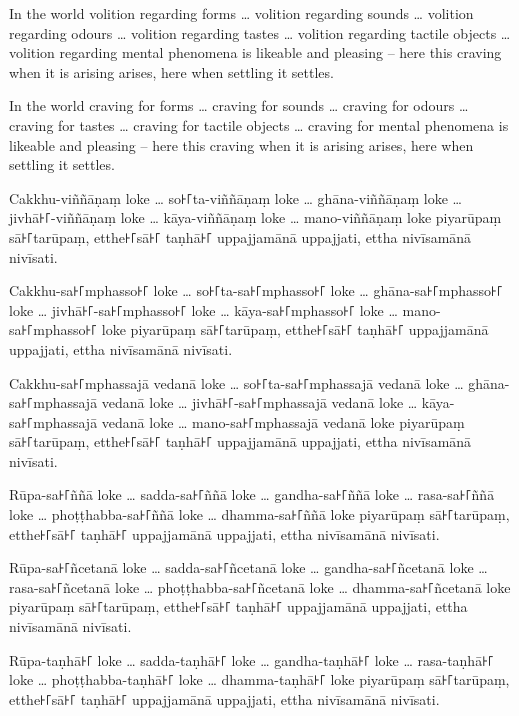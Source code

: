 In the world volition regarding forms \ldots{} volition regarding sounds
\ldots{} volition regarding odours \ldots{} volition regarding tastes \ldots{}
volition regarding tactile objects \ldots{} volition regarding mental phenomena
is likeable and pleasing -- here this craving when it is arising arises, here
when settling it settles.

In the world craving for forms \ldots{} craving for sounds \ldots{} craving for
odours \ldots{} craving for tastes \ldots{} craving for tactile objects \ldots{}
craving for mental phenomena is likeable and pleasing -- here this craving when
it is arising arises, here when settling it settles.

\paliPage

Cakkhu-viññāṇaṃ loke \ldots{} so꜔꜒ta-viññāṇaṃ loke \ldots{} ghāna-viññāṇaṃ loke
\ldots{} jivhā꜔꜒-viññāṇaṃ loke \ldots{} kāya-viññāṇaṃ loke \ldots{} mano-viññāṇaṃ
loke piyarūpaṃ sā꜔꜒tarūpaṃ, etthe꜔꜒sā꜔꜒ taṇhā꜔꜒ uppajjamānā uppajjati, ettha nivīsamānā
nivīsati.

Cakkhu-sa꜔꜒mphasso꜔꜒ loke \ldots{} so꜔꜒ta-sa꜔꜒mphasso꜔꜒ loke \ldots{} ghāna-sa꜔꜒mphasso꜔꜒ loke
\ldots{} jivhā꜔꜒-sa꜔꜒mphasso꜔꜒ loke \ldots{} kāya-sa꜔꜒mphasso꜔꜒ loke \ldots{} mano-sa꜔꜒mphasso꜔꜒
loke piyarūpaṃ sā꜔꜒tarūpaṃ, etthe꜔꜒sā꜔꜒ taṇhā꜔꜒ uppajjamānā uppajjati, ettha nivīsamānā
nivīsati.

Cakkhu-sa꜔꜒mphassajā vedanā loke \ldots{} so꜔꜒ta-sa꜔꜒mphassajā vedanā loke \ldots{}
ghāna-sa꜔꜒mphassajā vedanā loke \ldots{} jivhā꜔꜒-sa꜔꜒mphassajā vedanā loke \ldots{}
kāya-sa꜔꜒mphassajā vedanā loke \ldots{} mano-sa꜔꜒mphassajā vedanā loke piyarūpaṃ
sā꜔꜒tarūpaṃ, etthe꜔꜒sā꜔꜒ taṇhā꜔꜒ uppajjamānā uppajjati, ettha nivīsamānā nivīsati.

Rūpa-sa꜔꜒ññā loke \ldots{} sadda-sa꜔꜒ññā loke \ldots{} gandha-sa꜔꜒ññā loke \ldots{}
rasa-sa꜔꜒ññā loke \ldots{} phoṭṭhabba-sa꜔꜒ññā loke \ldots{} dhamma-sa꜔꜒ññā loke piyarūpaṃ
sā꜔꜒tarūpaṃ, etthe꜔꜒sā꜔꜒ taṇhā꜔꜒ uppajjamānā uppajjati, ettha nivīsamānā nivīsati.

Rūpa-sa꜔꜒ñcetanā loke \ldots{} sadda-sa꜔꜒ñcetanā loke \ldots{} gandha-sa꜔꜒ñcetanā loke
\ldots{} rasa-sa꜔꜒ñcetanā loke \ldots{} phoṭṭhabba-sa꜔꜒ñcetanā loke \ldots{}
dhamma-sa꜔꜒ñcetanā loke piyarūpaṃ sā꜔꜒tarūpaṃ, etthe꜔꜒sā꜔꜒ taṇhā꜔꜒ uppajjamānā uppajjati,
ettha nivīsamānā nivīsati.

Rūpa-taṇhā꜔꜒ loke \ldots{} sadda-taṇhā꜔꜒ loke \ldots{} gandha-taṇhā꜔꜒ loke \ldots{}
rasa-taṇhā꜔꜒ loke \ldots{} phoṭṭhabba-taṇhā꜔꜒ loke \ldots{} dhamma-taṇhā꜔꜒ loke piyarūpaṃ
sā꜔꜒tarūpaṃ, etthe꜔꜒sā꜔꜒ taṇhā꜔꜒ uppajjamānā uppajjati, ettha nivīsamānā nivīsati.

